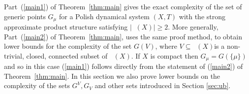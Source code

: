 \documentclass{amsart}
\theoremstyle{definition}
\newtheorem{lem}[thm]{Lemma}
\DeclareMathOperator{\Emp}{\mathcal{E}}%
\DeclareMathOperator{\MT}{\mathcal{M}_{\mathit T} }
\newcommand{\N}{\mathbb{N}}
\begin{document}
Part~(\ref{main1}) of Theorem~\ref{thm:main} gives the exact complexity of the set of generic
points $G_\mu$ for a Polish dynamical system $(X,T)$ with the strong approximate product structure satisfying $| \MT(X) | \ge 2$.
More generally,
Part~(\ref{main2}) of Theorem~\ref{thm:main}, uses the same proof method, to obtain lower bounds for the complexity of the set $G(V)$, where $V\subseteq \MT(X)$is  a non-trivial, closed,
connected subset of $\MT(X)$. If $X$ is compact then $G_\mu=G(\{ \mu\})$ and
so in this case (\ref{main1})  follows directly from the statement of
(\ref{main2}) of Theorem~\ref{thm:main}. In this section we also prove lower bounds on the complexity of the sets $G^V, G_V$ and other sets introduced in Section \ref{sec:ub}.


%
\end{document}
